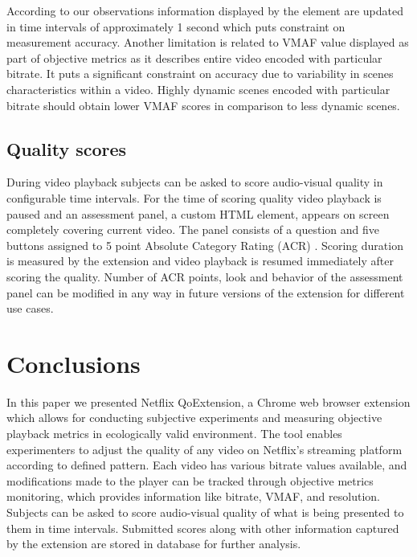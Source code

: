 \documentclass[conference]{IEEEtran}
\begin{document}
According to our observations information displayed by the element are updated in time intervals of approximately 1 second which puts constraint on measurement accuracy.
Another limitation is related to VMAF value displayed as part of objective metrics as it describes entire video encoded with particular bitrate. It puts a significant constraint on accuracy due to variability in scenes characteristics within a video. Highly dynamic scenes encoded with particular bitrate should obtain lower VMAF scores in comparison to less dynamic scenes.

\subsection{Quality scores}
During video playback subjects can be asked to score audio-visual quality in configurable time intervals. For the time of scoring quality video playback is paused and an assessment panel, a custom HTML element, appears on screen completely covering current video. 
The panel consists of a question and five buttons assigned to 5 point Absolute Category Rating (ACR) \cite{ITU-T-P.913}.
Scoring duration is measured by the extension and video playback is resumed immediately after scoring the quality.
Number of ACR points, look and behavior of the assessment panel can be modified in any way in future versions of the extension for different use cases.


\section{Conclusions}
In this paper we presented Netflix QoExtension, a Chrome web browser extension which allows for conducting subjective experiments and measuring objective playback metrics in ecologically valid environment. 
The tool enables experimenters to adjust the quality of any video on Netflix's streaming platform according to defined pattern. Each video has various bitrate values available, and modifications made to the player can be tracked through objective metrics monitoring, which provides information like bitrate, VMAF, and resolution. Subjects can be asked to score audio-visual quality of what is being presented to them in time intervals. Submitted scores along with other information captured by the extension are stored in database for further analysis.
 
\end{document}
